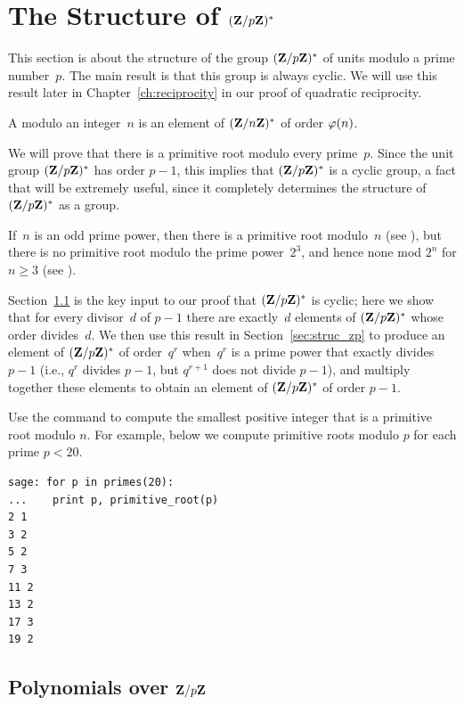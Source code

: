 \section{The Structure of $(\mathbf{Z}/p\mathbf{Z}{})^*$}
\label{sec:primitive}
This section is about the structure of the group $(\mathbf{Z}/p\mathbf{Z}{})^*$ of
units modulo a prime number~$p$.
The main result is that this group is always cyclic.
We will use this result later in Chapter~\ref{ch:reciprocity}
in our proof of quadratic reciprocity.

\begin{definition}\label{defn:primroot}
A  modulo an integer~$n$ is an element of
$(\mathbf{Z}/n\mathbf{Z}{})^*$ of order $\varphi(n)$.
\end{definition}
We will prove that there is a primitive root modulo every
prime~$p$.  Since the unit group
$(\mathbf{Z}/p\mathbf{Z}{})^*$ has order $p-1$, this implies that
$(\mathbf{Z}/p\mathbf{Z}{})^*$ is a cyclic group, a fact that will be extremely useful,
since it completely determines the structure of $(\mathbf{Z}/p\mathbf{Z}{})^*$ as a
group.

If~$n$ is an odd prime power, then there is a primitive root
modulo~$n$ (see ), but there is no primitive root
modulo the prime power~$2^3$, and hence none mod $2^n$ for
$n\geq 3$ (see ).

Section~\ref{sec:polys_zp} is the key input to our proof that
$(\mathbf{Z}/p\mathbf{Z}{})^*$ is cyclic; here we show that for every divisor~$d$ of $p-1$
there are exactly~$d$ elements of $(\mathbf{Z}/p\mathbf{Z}{})^*$ whose order divides~$d$.
We then use this result in Section~\ref{sec:struc_zp} to produce an
element of $(\mathbf{Z}/p\mathbf{Z}{})^*$ of order~$q^r$ when~$q^r$ is a prime power that
exactly divides $p-1$ (i.e., $q^r$ divides $p-1$, but $q^{r+1}$ does not
divide $p-1$), and multiply together these elements to obtain an element
of $(\mathbf{Z}/p\mathbf{Z}{})^*$ of order $p-1$.

\begin{sg}
  Use the  command to compute the smallest
  positive integer that is a primitive root modulo $n$.  For example,
  below we compute primitive roots modulo $p$ for each prime $p<20$.
\begin{verbatim}
sage: for p in primes(20):
...    print p, primitive_root(p)
2 1
3 2
5 2
7 3
11 2
13 2
17 3
19 2
\end{verbatim}
\end{sg}

\subsection{Polynomials over $\mathbf{Z}/p\mathbf{Z}{}$}\label{sec:polys_zp}

